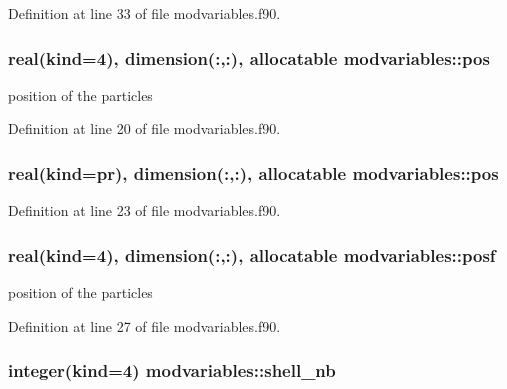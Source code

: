 Definition at line 33 of file modvariables.\-f90.

\hypertarget{classmodvariables_a2f72d5750b0cf2e9bfa6e139d09c6862}{
\subsubsection[{pos}]{\setlength{\rightskip}{0pt plus 5cm}real(kind=4), dimension(\-:,\-:), allocatable modvariables\-::pos}}\label{classmodvariables_a2f72d5750b0cf2e9bfa6e139d09c6862}


position of the particles 



Definition at line 20 of file modvariables.\-f90.

\hypertarget{classmodvariables_a1eb22f6b56e0963ff4d88a5114903517}{
\subsubsection[{pos}]{\setlength{\rightskip}{0pt plus 5cm}real(kind=pr), dimension(\-:,\-:), allocatable modvariables\-::pos}}\label{classmodvariables_a1eb22f6b56e0963ff4d88a5114903517}


Definition at line 23 of file modvariables.\-f90.

\hypertarget{classmodvariables_a7528c234a190760e036921b956ec9fe8}{
\subsubsection[{posf}]{\setlength{\rightskip}{0pt plus 5cm}real(kind=4), dimension(\-:,\-:), allocatable modvariables\-::posf}}\label{classmodvariables_a7528c234a190760e036921b956ec9fe8}


position of the particles 



Definition at line 27 of file modvariables.\-f90.

\hypertarget{classmodvariables_a8e749d6e70dade5cb6d75a09a99cefd7}{
\subsubsection[{shell\-\_\-nb}]{\setlength{\rightskip}{0pt plus 5cm}integer(kind=4) modvariables\-::shell\-\_\-nb}}\label{classmodvariables_a8e749d6e70dade5cb6d75a09a99cefd7}


